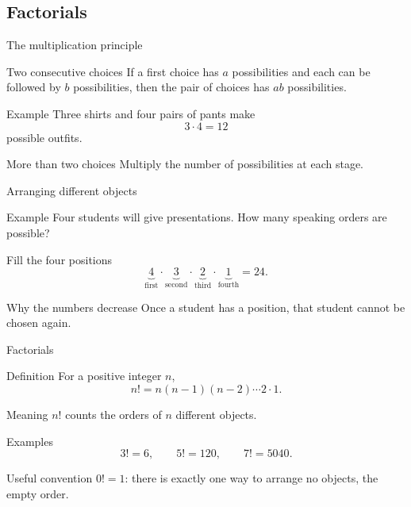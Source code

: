 \documentclass{beamer}
\begin{document}
\subsection{Factorials}

\begin{frame}{The multiplication principle}
\small
  \begin{block}{Two consecutive choices}
    If a first choice has $a$ possibilities and each can be followed by
    $b$ possibilities, then the pair of choices has $ab$ possibilities.
  \end{block}
\pause
  \begin{block}{Example}
    Three shirts and four pairs of pants make
    \[
       3\cdot4=12
    \]
    possible outfits.
  \end{block}
\pause
  \begin{block}{More than two choices}
    Multiply the number of possibilities at each stage.
  \end{block}
\end{frame}

\begin{frame}{Arranging different objects}
  \begin{block}{Example}
    Four students will give presentations.  How many speaking orders are possible?
  \end{block}
\pause
  \begin{block}{Fill the four positions}
    \[
      \underbrace{4}_{\text{first}}
      \cdot
      \underbrace{3}_{\text{second}}
      \cdot
      \underbrace{2}_{\text{third}}
      \cdot
      \underbrace{1}_{\text{fourth}}
      =24.
    \]
  \end{block}
\pause
  \begin{block}{Why the numbers decrease}
    Once a student has a position, that student cannot be chosen again.
  \end{block}
\end{frame}

\begin{frame}{Factorials}
\footnotesize
  \begin{block}{Definition}
    For a positive integer $n$,
    \[
       n!=n(n-1)(n-2)\cdots2\cdot1.
    \]
  \end{block}
\pause
  \begin{block}{Meaning}
    $n!$ counts the orders of $n$ different objects.
  \end{block}
\pause
  \begin{block}{Examples}
    \[
      3!=6,\qquad 5!=120,\qquad 7!=5040.
    \]
  \end{block}
\pause
  \begin{block}{Useful convention}
    $0!=1$: there is exactly one way to arrange no objects, the empty order.
  \end{block}
\end{frame}
\end{document}
